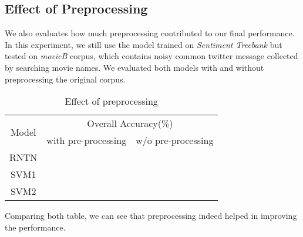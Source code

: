 \subsection{Effect of Preprocessing}
We also evaluates how much preprocessing contributed to our final performance. In this experiment, we still use the model trained on \textit{Sentiment Treebank} but tested on \textit{movieB} corpus, which contains noisy common twitter message collected by searching movie names. We evaluated both models with and without preprocessing the original corpus. 

\begin{table}[H]
  \begin{center}
    \begin{tabular}{ccc}\hline
      \multirow{2}{*}{Model} 
      & \multicolumn{2}{c}{Overall Accuracy(\%)} \\\cline{2-3}
    & with pre-processing & w/o pre-processing \\ \hline
    RNTN  &          &     	       \\ 
    SVM1  & ~        &              \\ 
    SVM2  & ~        &              \\ \hline
    \end{tabular}
    \end{center}
    \caption{\label{exp5_3} Effect of preprocessing}
\end{table}

Comparing both table, we can see that preprocessing indeed helped in improving the performance.  

